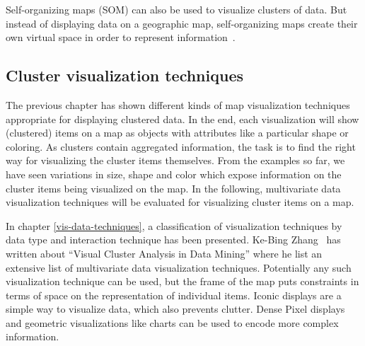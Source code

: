 Self-organizing maps (SOM) can also be used to visualize clusters of data. But instead of displaying data on a geographic map, self-organizing maps create their own virtual space in order to represent information~\cite{noellenburg11geovis}.  


\subsection{Cluster visualization techniques}
\label{chapter:cluster-vis}

The previous chapter has shown different kinds of map visualization techniques appropriate for displaying clustered data. In the end, each visualization will show (clustered) items on a map as objects with attributes like a particular shape or coloring. As clusters contain aggregated information, the task is to find the right way for visualizing the cluster items themselves. From the examples so far, we have seen variations in size, shape and color which expose information on the cluster items being visualized on the map. In the following, multivariate data visualization techniques will be evaluated for visualizing cluster items on a map.

In chapter \ref{vis-data-techniques}, a classification of visualization techniques by data type and interaction technique has been presented. Ke-Bing Zhang~\cite{zhang07thesis} has written about ``Visual Cluster Analysis in Data Mining'' where he list an extensive list of multivariate data visualization techniques. Potentially any such visualization technique can be used, but the frame of the map puts constraints in terms of space on the representation of individual items. Iconic displays are a simple way to visualize data, which also prevents clutter. Dense Pixel displays and geometric visualizations like charts can be used to encode more complex information.

